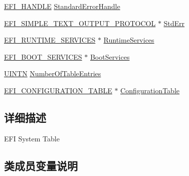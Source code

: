 \begin{DoxyCompactItemize}
\item 
\hyperlink{_uefi_base_type_8h_af943d518ce8a229e7e51ce3fed0e3122}{E\+F\+I\+\_\+\+H\+A\+N\+D\+LE} \hyperlink{struct_e_f_i___s_y_s_t_e_m___t_a_b_l_e_a80fe1ce0cd50f661e7c94005bb7c1122}{Standard\+Error\+Handle}
\item 
\hyperlink{struct___e_f_i___s_i_m_p_l_e___t_e_x_t___o_u_t_p_u_t___p_r_o_t_o_c_o_l}{E\+F\+I\+\_\+\+S\+I\+M\+P\+L\+E\+\_\+\+T\+E\+X\+T\+\_\+\+O\+U\+T\+P\+U\+T\+\_\+\+P\+R\+O\+T\+O\+C\+OL} $\ast$ \hyperlink{struct_e_f_i___s_y_s_t_e_m___t_a_b_l_e_a06e4ea7c4cbcaf05dea5fa6e3901a870}{Std\+Err}
\item 
\hyperlink{struct_e_f_i___r_u_n_t_i_m_e___s_e_r_v_i_c_e_s}{E\+F\+I\+\_\+\+R\+U\+N\+T\+I\+M\+E\+\_\+\+S\+E\+R\+V\+I\+C\+ES} $\ast$ \hyperlink{struct_e_f_i___s_y_s_t_e_m___t_a_b_l_e_a5d06e1c6b6035590af33040f67ea5ec8}{Runtime\+Services}
\item 
\hyperlink{struct_e_f_i___b_o_o_t___s_e_r_v_i_c_e_s}{E\+F\+I\+\_\+\+B\+O\+O\+T\+\_\+\+S\+E\+R\+V\+I\+C\+ES} $\ast$ \hyperlink{struct_e_f_i___s_y_s_t_e_m___t_a_b_l_e_a179e0fce9d52f3fb89eef175a588f29d}{Boot\+Services}
\item 
\hyperlink{_processor_bind_8h_ac0b1ca9b01db611e0f7f2080a2699135}{U\+I\+N\+TN} \hyperlink{struct_e_f_i___s_y_s_t_e_m___t_a_b_l_e_ae68405ca7cb74a314802c4210948abc7}{Number\+Of\+Table\+Entries}
\item 
\hyperlink{struct_e_f_i___c_o_n_f_i_g_u_r_a_t_i_o_n___t_a_b_l_e}{E\+F\+I\+\_\+\+C\+O\+N\+F\+I\+G\+U\+R\+A\+T\+I\+O\+N\+\_\+\+T\+A\+B\+LE} $\ast$ \hyperlink{struct_e_f_i___s_y_s_t_e_m___t_a_b_l_e_a231e3be7b67b4362b4787c7bda5c3679}{Configuration\+Table}
\end{DoxyCompactItemize}


\subsection{详细描述}
E\+FI System Table 

\subsection{类成员变量说明}
\mbox{\label{struct_e_f_i___s_y_s_t_e_m___t_a_b_l_e_a179e0fce9d52f3fb89eef175a588f29d}} 
